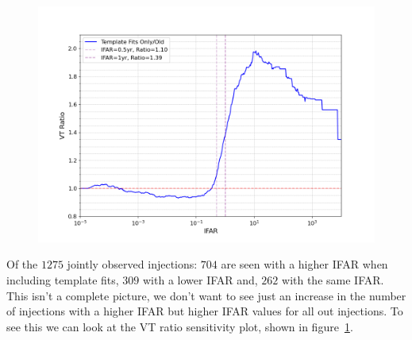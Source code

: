 %
\begin{figure}
    \centering
    \includegraphics[width=1\textwidth]{images/5_pycbclive/fits_only_0s_vt_ratio.png}
    \caption{}
    \label{5:fig:sensitivity-fits-only-0s}
\end{figure}
%
Of the $1275$ jointly observed injections: $704$ are seen with a higher IFAR when including template fits, $309$ with a lower IFAR and, $262$ with the same IFAR. This isn't a complete picture, we don't want to see just an increase in the number of injections with a higher IFAR but higher IFAR values for all out injections. To see this we can look at the VT ratio sensitivity plot, shown in figure~\ref{5:fig:sensitivity-fits-only-0s}.

